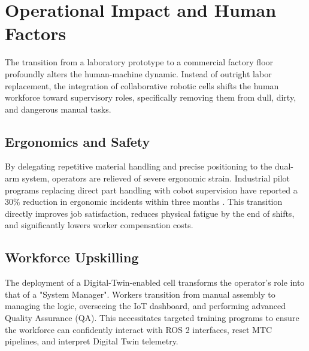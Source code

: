 \section{Operational Impact and Human Factors}

The transition from a laboratory prototype to a commercial factory floor profoundly alters the human-machine dynamic. Instead of outright labor replacement, the integration of collaborative robotic cells shifts the human workforce toward supervisory roles, specifically removing them from dull, dirty, and dangerous manual tasks.

\subsection{Ergonomics and Safety}
By delegating repetitive material handling and precise positioning to the dual-arm system, operators are relieved of severe ergonomic strain. Industrial pilot programs replacing direct part handling with cobot supervision have reported a 30\% reduction in ergonomic incidents within three months \cite{szghtech2026cobot}. This transition directly improves job satisfaction, reduces physical fatigue by the end of shifts, and significantly lowers worker compensation costs.

\subsection{Workforce Upskilling}
The deployment of a Digital-Twin-enabled cell transforms the operator's role into that of a "System Manager". Workers transition from manual assembly to managing the logic, overseeing the IoT dashboard, and performing advanced Quality Assurance (QA). This necessitates targeted training programs to ensure the workforce can confidently interact with ROS 2 interfaces, reset MTC pipelines, and interpret Digital Twin telemetry.